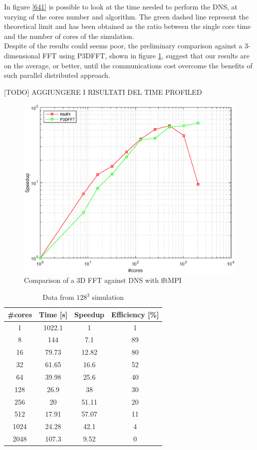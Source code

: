 In figure \ref{641} is possible to look at the time needed to perform the DNS, at varying of the cores number and algorithm.
The green dashed line represent the theoretical limit and has been obtained as the ratio between the single core time and the number of cores of the simulation.  \\
Despite of the results could seems poor, the preliminary comparison against a 3-dimensional FFT using P3DFFT, shown in figure \ref{643}, suggest that our results are on the average, or better, until the communications cost overcome the benefits of such parallel distributed approach.

[TODO] AGGIUNGERE I RISULTATI DEL TIME PROFILED

\begin{figure}
\begin{center}
\includegraphics[scale=0.6]{grafici/643}
\caption{Comparison of a 3D FFT against DNS with fftMPI}
\label{643}
\end{center}
\end{figure}

\begin{table}
\caption{Data from $128^{3}$ simulation}
\begin{center}
\begin{tabular}{c c c c}
\toprule
\textbf{\#cores} & \textbf{Time [s]} & \textbf{Speedup} & \textbf{Efficiency [\%]} \\
\hline
1 & 1022.1 & 1 & 1 \\
8 & 144 & 7.1 & 89 \\
16 & 79.73 & 12.82 & 80 \\
32 & 61.65 & 16.6 & 52 \\
64 & 39.98 & 25.6 & 40 \\
128 & 26.9 & 38 & 30 \\
256 & 20 & 51.11 & 20 \\
512 & 17.91 & 57.07 & 11 \\
1024 & 24.28 & 42.1 & 4 \\
2048 & 107.3 & 9.52 & 0 \\
\bottomrule
\end{tabular}
\end{center}
\label{64data}
\end{table}%


